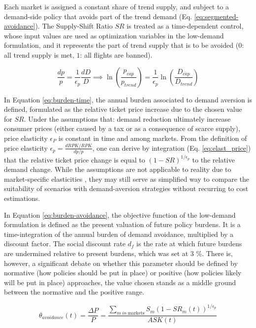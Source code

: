 \documentclass[
]{kaohandt}
\begin{document}
Each market is assigned a constant share of trend supply, and subject to a demand-side policy that avoids part of the trend demand (Eq. \ref{eq:segmented-avoidance}). The Supply-Shift Ratio $SR$ is treated as a time-dependent control, whose input values are used as optimization variables in the low-demand formulation, and it represents the part of trend supply that is to be avoided ($0$: all trend supply is met, $1$: all flights are banned).

\begin{equation}
    \label{eq:elast_price}
    \frac{dp}{p}=\frac{1}{\epsilon_p}\frac{dD}{D} \implies \ln\left(\frac{p_{cap}}{p_{trend}}\right) = \frac{1}{\epsilon_p} \ln\left(\frac{D_{cap}}{D_{trend}}\right)
\end{equation}

In Equation \ref{eq:burden-time}, the annual burden associated to demand aversion is defined, formulated as the relative ticket price increase due to the chosen value for $SR$. Under the assumptions that: demand reduction ultimately increase consumer prices (either caused by a tax or as a consequence of scarce supply), price elasticity $\epsilon_P$ is constant in time and among markets. From the definition of price elasticity $\epsilon_p=\frac{dRPK/RPK}{dp/p}$, one can derive by integration (Eq. \ref{eq:elast_price}) that the relative ticket price change is equal to $(1-SR)^{1/\epsilon_p}$ to the relative demand change. While the assumptions are not applicable to reality due to market-specific elasticities , they may still serve as simplified way to compare the suitability of scenarios with demand-aversion strategies without recurring to cost estimations.

In Equation \ref{eq:burden-avoidance}, the objective function of the low-demand formulation is defined as the present valuation of future policy burdens. It is a time-integration of the annual burden of demand avoidance, multiplied by a discount factor. The social discount rate $d_f$ is the rate at which future burdens are undermined relative to present burdens, which was set at 3 \%. There is, however, a significant debate  on whether this parameter should be defined by normative (how policies should be put in place) or positive (how policies likely will be put in place) approaches, the value chosen stands as a middle ground between the normative and the positive range.

\begin{equation}
\label{eq:burden-time}
    \theta_{avoidance}(t) = \frac{\Delta P}{P} = \frac{\sum_{m\ in\ \text{markets}} S_m \left(1-SR_m(t)\right)^{1/\epsilon_p}}{ASK(t)}
\end{equation}
\end{document}

